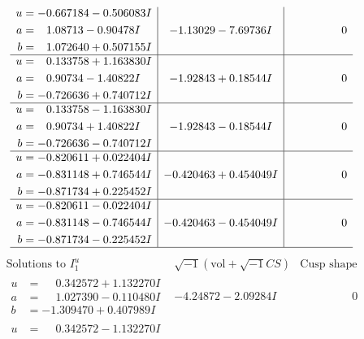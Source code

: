 \documentclass[1p]{elsarticle_modified}
\theoremstyle{definition}
\newcommand{\I}{\sqrt{-1}}
\begin{document}
$$\begin{array}{c|c|c}
\begin{aligned}
u &= -0.667184 - 0.506083 I \\
a &= \phantom{-}1.08713 - 0.90478 I \\
b &= \phantom{-}1.072640 + 0.507155 I\end{aligned}
 & -1.13029 - 7.69736 I & \phantom{-0.000000 } 0 \\ \hline\begin{aligned}
u &= \phantom{-}0.133758 + 1.163830 I \\
a &= \phantom{-}0.90734 - 1.40822 I \\
b &= -0.726636 + 0.740712 I\end{aligned}
 & -1.92843 + 0.18544 I & \phantom{-0.000000 } 0 \\ \hline\begin{aligned}
u &= \phantom{-}0.133758 - 1.163830 I \\
a &= \phantom{-}0.90734 + 1.40822 I \\
b &= -0.726636 - 0.740712 I\end{aligned}
 & -1.92843 - 0.18544 I & \phantom{-0.000000 } 0 \\ \hline\begin{aligned}
u &= -0.820611 + 0.022404 I \\
a &= -0.831148 + 0.746544 I \\
b &= -0.871734 + 0.225452 I\end{aligned}
 & -0.420463 + 0.454049 I & \phantom{-0.000000 } 0 \\ \hline\begin{aligned}
u &= -0.820611 - 0.022404 I \\
a &= -0.831148 - 0.746544 I \\
b &= -0.871734 - 0.225452 I\end{aligned}
 & -0.420463 - 0.454049 I & \phantom{-0.000000 } 0\\
 \hline 
 \end{array}$$\newpage$$\begin{array}{c|c|c}  
\text{Solutions to }I^u_{1}& \I (\text{vol} + \sqrt{-1}CS) & \text{Cusp shape}\\
 \hline 
\begin{aligned}
u &= \phantom{-}0.342572 + 1.132270 I \\
a &= \phantom{-}1.027390 - 0.110480 I \\
b &= -1.309470 + 0.407989 I\end{aligned}
 & -4.24872 - 2.09284 I & \phantom{-0.000000 } 0 \\ \hline\begin{aligned}
u &= \phantom{-}0.342572 - 1.132270 I \\

\end{aligned}
\end{array}$$
\end{document}

